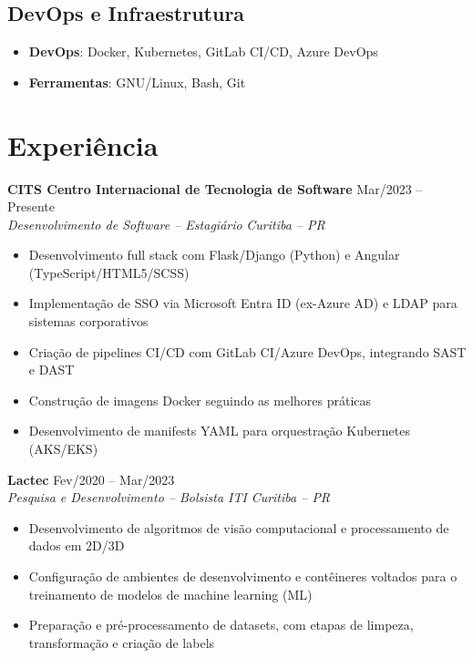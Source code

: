 \documentclass[a4paper,10pt]{article}
\newcommand{\entry}[4]{
    \noindent\textbf{#1} \hfill #2 \\
    \noindent\textit{#3} \hfill \textit{#4} \\
    \vspace{2pt}
}
\begin{document}
\subsection*{DevOps e Infraestrutura}
\begin{itemize}
    \setlength\itemsep{0em}
    \item \textbf{DevOps}: Docker, Kubernetes, GitLab CI/CD, Azure DevOps
    \item \textbf{Ferramentas}: GNU/Linux, Bash, Git
\end{itemize}

\section*{Experiência}
\vspace{0.6em}

\entry{CITS \textbullet{} Centro Internacional de Tecnologia de Software}{\faCalendar \space Mar/2023 -- Presente}{Desenvolvimento de Software -- Estagiário}{Curitiba -- PR}
\vspace{-1.6em}
\begin{itemize}
    \setlength\itemsep{0em}
    \item Desenvolvimento full stack com Flask/Django (Python) e Angular (TypeScript/HTML5/SCSS)
    \item Implementação de SSO via Microsoft Entra ID (ex-Azure AD) e LDAP para sistemas corporativos
    \item Criação de pipelines CI/CD com GitLab CI/Azure DevOps, integrando SAST e DAST
    \item Construção de imagens Docker seguindo as melhores práticas
    \item Desenvolvimento de manifests YAML para orquestração Kubernetes (AKS/EKS)
\end{itemize}

\entry{Lactec}{\faCalendar \space Fev/2020 -- Mar/2023}{Pesquisa e Desenvolvimento -- Bolsista ITI}{Curitiba -- PR}
\vspace{-1.6em}
\begin{itemize}
    \setlength\itemsep{0em}
    \item Desenvolvimento de algoritmos de visão computacional e processamento de dados em 2D/3D
    \item Configuração de ambientes de desenvolvimento e contêineres voltados para o treinamento de modelos de machine learning (ML)
    \item Preparação e pré-processamento de datasets, com etapas de limpeza, transformação e criação de labels
\end{itemize}
\end{document}
